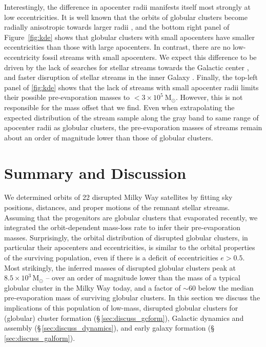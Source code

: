 \documentclass[twocolumn]{aastex63}
\newcommand{\msun}{\ensuremath{\textrm{M}_\odot}}
\begin{document}
Interestingly, the difference in apocenter radii manifests itself most strongly at low eccentricities.
It is well known that the orbits of globular clusters become radially anisotropic towards larger radii \citep[e.g.][]{dinescu99}, and the bottom right panel of Figure~\ref{fig:kde} shows that globular clusters with small apocenters have smaller eccentricities than those with large apocenters.
In contrast, there are no low-eccentricity fossil streams with small apocenters.
We expect this difference to be driven by the lack of searches for stellar streams towards the Galactic center \citep[e.g.,][]{malhan:2018, ibata:2019}, and faster disruption of stellar streams in the inner Galaxy \citep[e.g., due to enhanced dispersal caused by the rotating bar,][]{price-whelan:2016, hattori:2016}.
Finally, the top-left panel of \autoref{fig:kde} shows that the lack of streams with small apocenter radii limits their possible pre-evaporation masses to $<3\times10^5~\msun$. However, this is not responsible for the mass offset that we find. Even when extrapolating the expected distribution of the stream sample along the gray band to same range of apocenter radii as globular clusters, the pre-evaporation masses of streams remain about an order of magnitude lower than those of globular clusters.


\section{Summary and Discussion}
\label{sec:discussion}

We determined orbits of 22 disrupted Milky Way satellites by fitting sky positions, distances, and proper motions of the remnant stellar streams.
Assuming that the progenitors are globular clusters that evaporated recently, we integrated the orbit-dependent mass-loss rate to infer their pre-evaporation masses.
Surprisingly, the orbital distribution of disrupted globular clusters, in particular their apocenters and eccentricities, is similar to the orbital properties of the surviving population, even if there is a deficit of eccentricities $e>0.5$.
Most strikingly, the inferred masses of disrupted globular clusters peak at $8.5\times10^3\,\msun$ -- over an order of magnitude lower than the mass of a typical globular cluster in the Milky Way today, and a factor of $\sim60$ below the median pre-evaporation mass of surviving globular clusters.
In this section we discuss the implications of this population of low-mass, disrupted globular clusters for (globular) cluster formation (\S\,\ref{sec:discuss_gcform}), Galactic dynamics and assembly (\S\,\ref{sec:discuss_dynamics}), and early galaxy formation (\S\,\ref{sec:discuss_galform}).
\end{document}
